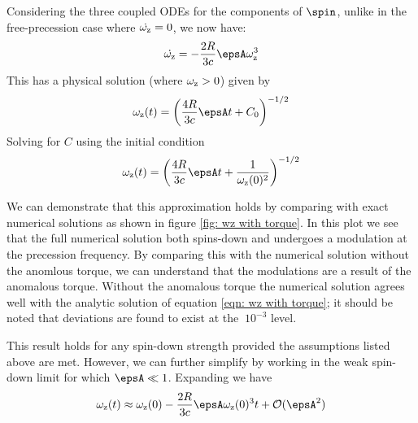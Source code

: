\documentclass[/home/greg/Thesis/main/main.tex]{subfiles}
\begin{document}
Considering the three coupled ODEs for the components of $\spin$, unlike in the
free-precession case where $\dot{\omega_{\mathrm{z}}} = 0$, we now have:
\begin{align}
\dot{\wz} = -\frac{2R}{3c} \epsA \wz^{3}
\end{align}
This has a physical solution (where $\omega_{\mathrm{z}} > 0$) given by 
\begin{align}
\wz(t) = \left(\frac{4R}{3c} \epsA t + C_0 \right)^{-1/2}
\end{align}
Solving for $C$ using the initial condition
\begin{align}
\wz(t) = \left(\frac{4R}{3c} \epsA t + \frac{1}{\wz(0)^{2}}\right)^{-1/2}
\label{eqn: wz with torque}
\end{align}

We can demonstrate that this approximation holds by comparing with exact
numerical solutions as shown in figure \ref{fig: wz with torque}. In this plot
we see that the full numerical solution both spins-down and undergoes a
modulation at the precession frequency. By comparing this with the numerical
solution without the anomlous torque, we can understand that the modulations
are a result of the anomalous torque. Without the anomalous torque the numerical
solution agrees well with the analytic solution of equation 
\eqref{eqn: wz with torque}; it should be noted that deviations are found
to exist at the $~10^{-3}$ level.


This result holds for any spin-down strength provided the assumptions listed
above are met. However, we can further simplify by working in the weak 
spin-down limit for which $\epsA \ll 1$. Expanding we have
\begin{equation}
\wz(t) \approx \wz(0) - \frac{2R}{3c}\epsA \wz(0)^{3} t + \mathcal{O}(\epsA^{2})
\end{equation}
\end{document}
